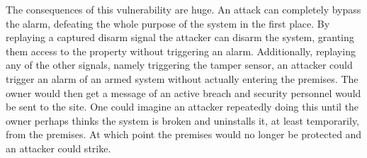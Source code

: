 The consequences of this vulnerability are huge. An attack can completely bypass the alarm, defeating the whole purpose of the system in the first place. By replaying a captured disarm signal the attacker can disarm the system, granting them access to the property without triggering an alarm. Additionally, replaying any of the other signals, namely triggering the tamper sensor, an attacker could trigger an alarm of an armed system without actually entering the premises. The owner would then get a message of an active breach and security personnel would be sent to the site. One could imagine an attacker repeatedly doing this until the owner perhaps thinks the system is broken and uninstalls it, at least temporarily, from the premises. At which point the premises would no longer be protected and an attacker could strike.

